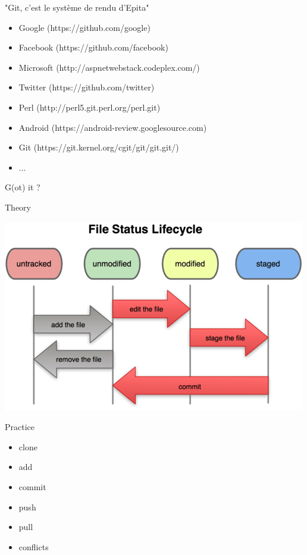 \begin{frame}
\begin{center}{\large "Git, c'est le système de rendu d'Epita"}\end{center}

  \begin{itemize}
    \item Google (https://github.com/google)
    \item Facebook (https://github.com/facebook)
    \item Microsoft (http://aspnetwebstack.codeplex.com/)
    \item Twitter (https://github.com/twitter)
    \item Perl (http://perl5.git.perl.org/perl.git)
    \item Android (https://android-review.googlesource.com)
    \item Git (https://git.kernel.org/cgit/git/git.git/)
    \item ...
  \end{itemize}

  G(ot) it ?

\end{frame}
\begin{frame}
\begin{center}{\large Theory}\end{center}
  \begin{center}
  \includegraphics[scale=0.5]{img/lifecycle.png}
\end{center}
\end{frame}
\begin{frame}

\begin{center}{\large Practice}\end{center}

  \begin{itemize}
    \item clone

    \item add

    \item commit

    \item push

    \item pull

    \item conflicts
  \end{itemize}
\end{frame}
